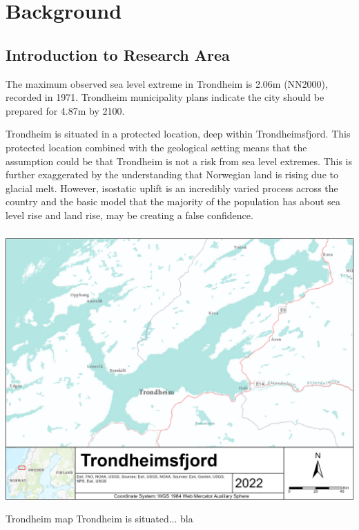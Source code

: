 \chapter{Background}

\section{Introduction to Research Area}

The maximum observed sea level extreme in Trondheim is 2.06m (NN2000), recorded in 1971. Trondheim municipality plans indicate the city should be prepared for 4.87m by 2100. 

Trondheim is situated in a protected location, deep within Trondheimsfjord. This protected location combined with the geological setting means that the assumption could be that Trondheim is not a risk from sea level extremes. This is further exaggerated by the understanding that Norwegian land is rising due to glacial melt. However, isostatic uplift is an incredibly varied process across the country and the basic model that the majority of the population has about sea level rise and land rise, may be creating a false confidence. 

\paragraph{}
\includegraphics[width=1\textwidth]{fig/Trondheimsfjord.png}
\begin{frame}{Trondheim map }
    Trondheim is situated... bla
\end{frame}

